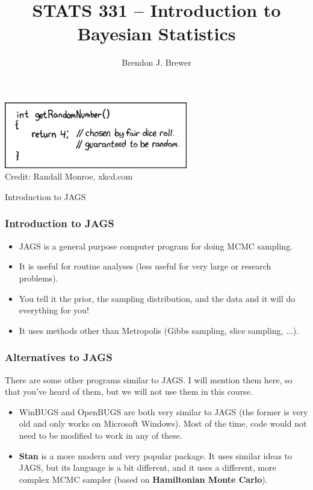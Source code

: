 \documentclass{beamer}
\author{Brendon J. Brewer}
\title{STATS 331 -- Introduction to Bayesian Statistics}
\institute{The University of Auckland}
\date{}
\begin{document}
\frame{\titlepage}

\begin{frame}
\begin{center}
\includegraphics[width=0.6\textwidth]{images/random_number.png} \\

Credit: Randall Monroe, xkcd.com
\end{center}

\end{frame}

\begin{frame}
\begin{center}
\Large
Introduction to JAGS
\end{center}
\end{frame}


\begin{frame}
\frametitle{Introduction to JAGS}

\begin{itemize}
\item JAGS is a general purpose computer program for doing
MCMC sampling.\pause
\item It is useful for routine analyses (less useful for very large or
research problems).\pause
\item You tell it the prior, the sampling distribution, and the data and it will
do everything for you!\pause
\item It uses methods other than Metropolis (Gibbs sampling,
slice sampling, ...).
\end{itemize}

\end{frame}


\begin{frame}
\frametitle{Alternatives to JAGS}

There are some other programs similar to JAGS. I will mention them here,
so that you've heard of them, but we will not use them in this course.

\begin{itemize}
\item WinBUGS and OpenBUGS are both very similar to JAGS (the former is very
old and only works on Microsoft Windows).
Most of the time, code would not need to be modified to work in any of these.\pause
\item {\bf Stan} is a more modern and very popular package. It uses similar
ideas to JAGS, but its language is a bit different, and it uses a different,
more complex
MCMC sampler (based on {\bf Hamiltonian Monte Carlo}).
\end{itemize}

\end{frame}
\end{document}
